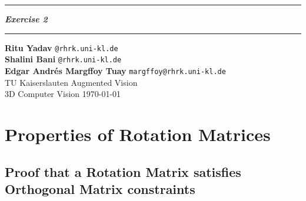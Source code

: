 \documentclass{article}
\newcommand{\squishlist}{
 \begin{list}{$\bullet$}
  { \setlength{\itemsep}{0pt}
     \setlength{\parsep}{3pt}
     \setlength{\topsep}{3pt}
     \setlength{\partopsep}{0pt}
     \setlength{\leftmargin}{1.5em}
     \setlength{\labelwidth}{1em}
     \setlength{\labelsep}{0.5em} } }
\newcommand{\squishend}{
  \end{list}  }
\begin{document}
 \def\maketitle{%
 \thispagestyle{plain}
 \vspace{-10ex}
 \hrule
 \bigskip
 \begin{center}
 {\Large{\textbf{\@title}}}
 \end{center}
 \bigskip
 \hrule

 \bigskip

 \begin{flushleft}
 \textbf{\normalsize{Ritu Yadav}} \hfill \texttt{@rhrk.uni-kl.de}
 \\
 \vspace{5pt}
 \textbf{\normalsize{Shalini Bani}} \hfill \texttt{@rhrk.uni-kl.de}
 \\
 \vspace{5pt}
 \textbf{\normalsize{Edgar Andr\'{e}s Margffoy Tuay}} \hfill \texttt{margffoy@rhrk.uni-kl.de}
 \\
 \vspace{5pt}
 TU Kaiserslauten \hfill Augmented Vision
 \\
 \vspace{5pt}
 3D Computer Vision \vspace{5pt}
\hfill \today \\ 
 \end{flushleft}
 }
\def\title#1{\def\@title{#1}}
\title{\textit{Exercise 2}}



\maketitle

\section{Properties of Rotation Matrices}
\subsection{Proof that a Rotation Matrix satisfies Orthogonal Matrix constraints}
\end{document}

